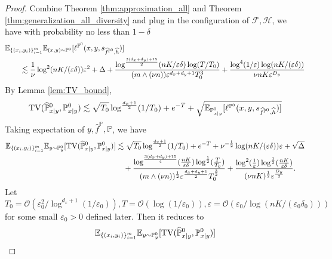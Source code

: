 \documentclass[11pt]{article}
\numberwithin{equation}{section}
\renewcommand{\P}{\mathbb{P}}
\begin{document}
\begin{proof}
    Combine Theorem \ref{thm:approximation_all} and Theorem \ref{thm:generalization_all_diversity} and plug in the configuration of $\mathcal{F},\mathcal{H}$, we have with probability no less than $1-\delta$
    \begin{equation}
        \begin{aligned}
            &\E_{\{(x_i,y_i)\}_{i=1}^m} \E_{(x,y)\sim\P^0} [\ell^{\P^0}(x,y,s_{\widehat{f}^{\P^0},\widehat{h}})] \\
            &\qquad \lesssim 
            \frac{1}{\nu}\log^2(nK/(\varepsilon\delta))\varepsilon^2+\Delta+\frac{\log^{\frac{3(d_x+d_y)+15}{2}}(nK/\varepsilon\delta)\log(T/T_0)}{(m\wedge (\nu n))\varepsilon^{d_x+d_y+1}T_0^3}+\frac{\log^4(1/\varepsilon)\log(nK/(\varepsilon\delta))}{\nu nK\varepsilon^{D_y}}
        \end{aligned}
    \end{equation}
    By Lemma \ref{lem:TV_bound},
    \begin{equation}
        \mathrm{TV}(\widehat{\P}^0_{x|y},\P^0_{x|y})
        \lesssim \sqrt{T_0}\log^{\frac{d_x+1}{2}}(1/T_0)+e^{-T}+\sqrt{\E_{\P^0_{x|y}}[\ell^{\P^0}(x,y,s_{\widehat{f}^{\P^0},\widehat{h}})]}
    \end{equation}
    Taking expectation of $y,\widehat{f}^\P,\P$, we have
    \begin{equation}
        \begin{aligned}
            \E_{\{(x_i,y_i)\}_{i=1}^m}\E_{y\sim\P^0_y} [\mathrm{TV}(\widehat{\P}^0_{x|y},\P^0_{x|y})]
            &\lesssim \sqrt{T_0}\log^{\frac{d_x+1}{2}}(1/T_0)+e^{-T} + \nu^{-\frac{1}{2}}\log(nK/(\varepsilon\delta))\varepsilon + \sqrt{\Delta} \\
            &\quad +\frac{\log^{\frac{3(d_x+d_y)+15}{4}}(\frac{nK}{\varepsilon\delta})\log^{\frac{1}{2}}(\frac{T}{T_0})}{(m\wedge (\nu n))^{\frac{1}{2}}\varepsilon^{\frac{d_x+d_y+1}{2}}T_0^{\frac{3}{2}}}+\frac{\log^2(\frac{1}{\varepsilon})\log^{\frac{1}{2}}(\frac{nK}{\varepsilon\delta})}{(\nu nK)^{\frac{1}{2}}\varepsilon^{\frac{D_y}{2}}}.
        \end{aligned}
    \end{equation}
    Let $T_0=\mathcal{O}\left(\varepsilon_0^2/\log^{d_x+1}(1/\varepsilon_0)\right), T=\mathcal{O}(\log(1/\varepsilon_0)), \varepsilon=\mathcal{O}(\varepsilon_0/\log(nK/(\varepsilon_0\delta_0)))$ for some small $\varepsilon_0>0$ defined later.
    Then it reduces to
    \begin{equation}
        \E_{\{(x_i,y_i)\}_{i=1}^m}\E_{y\sim\P^0_y} [\mathrm{TV}(\widehat{\P}^0_{x|y},\P^0_{x|y})]

\end{equation}
\end{proof}
\end{document}
